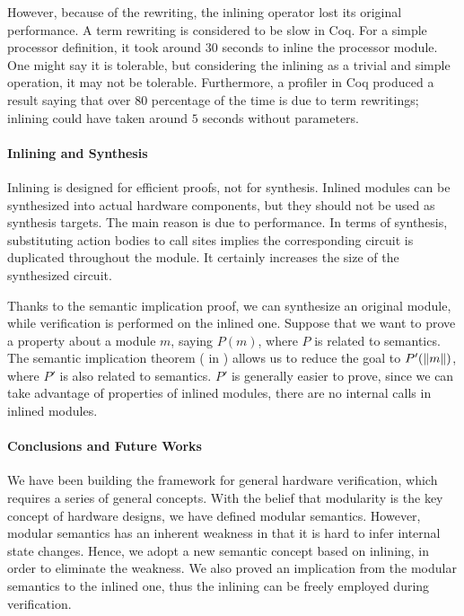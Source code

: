 However, because of the rewriting, the inlining operator lost its
original performance. A term rewriting is considered to be slow in
Coq. For a simple processor definition, it took around $30$ seconds to
inline the processor module. One might say it is tolerable, but
considering the inlining as a trivial and simple operation, it may not
be tolerable. Furthermore, a profiler in Coq produced a result saying
that over $80$ percentage of the time is due to term rewritings;
inlining could have taken around $5$ seconds without parameters.

\paragraph{Inlining and Synthesis}

Inlining is designed for efficient proofs, not for synthesis. Inlined
modules can be synthesized into actual hardware components, but they
should not be used as synthesis targets. The main reason is due to
performance. In terms of synthesis, substituting action bodies to call
sites implies the corresponding circuit is duplicated throughout the
module. It certainly increases the size of the synthesized circuit.

Thanks to the semantic implication proof, we can synthesize an
original module, while verification is performed on the inlined
one. Suppose that we want to prove a property about a module $m$,
saying $P(m)$, where $P$ is related to semantics. The semantic
implication theorem ( in
) allows us to reduce the goal to
$P'(\| m \|)$, where $P'$ is also related to semantics. $P'$ is
generally easier to prove, since we can take advantage of properties
of inlined modules, \eg{} there are no internal calls in inlined
modules.

\paragraph{Conclusions and Future Works}

We have been building the \Kami{} framework for general hardware
verification, which requires a series of general concepts. With the
belief that modularity is the key concept of hardware designs, we have
defined modular semantics. However, modular semantics has an inherent
weakness in that it is hard to infer internal state changes. Hence, we
adopt a new semantic concept based on inlining, in order to eliminate
the weakness. We also proved an implication from the modular semantics
to the inlined one, thus the inlining can be freely employed during
verification.

